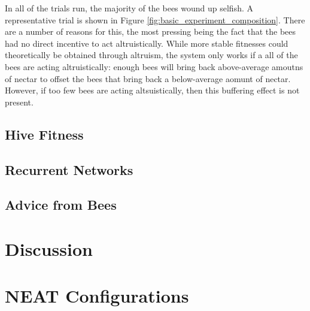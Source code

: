 \documentclass[11pt]{article}
\begin{document}
			In all of the trials run, the majority of the bees wound up selfish. A representative trial is shown in Figure \ref{fig:basic_experiment_composition}. There are a number of reasons for this, the most pressing being the fact that the bees had no direct incentive to act altruistically. While more stable fitnesses could theoretically be obtained through altruism, the system only works if a all of the bees are acting altruistically: enough bees will bring back above-average amoutns of nectar to offset the bees that bring back a below-average aomunt of nectar. However, if too few bees are acting altsuistically, then this buffering effect is not present. 





		\subsection{Hive Fitness} %
		\label{sub:hive_fitness}
		\lipsum[10-12]

		\subsection{Recurrent Networks} %
		\label{sub:recurrent_networks}
		\lipsum[12-14]

		\subsection{Advice from Bees} %
		\label{sub:advice_from_bees}
		


	\section{Discussion} %
	\label{sec:discussion}
	\lipsum[14-20]
	\singlespacing
	\appendix
	\pagebreak
	\section{NEAT Configurations} %
	\label{sec:neat_configurations}
	
\end{document}
